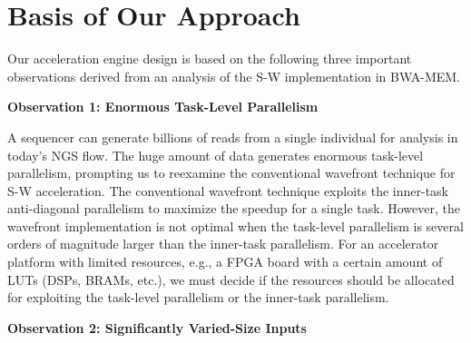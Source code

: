 \section{Basis of Our Approach}
\label{sec:approach}

Our acceleration engine design is based on the following three important observations 
derived from an analysis of the S-W implementation in BWA-MEM.

\vspace{1pt}
\textbf{Observation 1: Enormous Task-Level Parallelism}
\vspace{1pt}

A sequencer can generate billions of reads from a single individual for analysis in today's NGS flow.
The huge amount of data generates enormous task-level parallelism, prompting us to reexamine the conventional wavefront technique for S-W acceleration.
The conventional wavefront technique exploits the inner-task anti-diagonal parallelism to maximize the speedup for a single task.
However, the wavefront implementation is not optimal when the task-level parallelism is several orders of magnitude larger than the inner-task parallelism.
For an accelerator platform with limited resources, e.g., a FPGA board with a certain amount of LUTs (DSPs, BRAMs, etc.), we must decide if the resources should be allocated for exploiting the task-level parallelism or the inner-task parallelism.

\vspace{1pt}
\textbf{Observation 2: Significantly Varied-Size Inputs}
\vspace{1pt}


